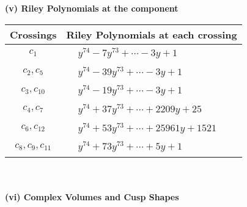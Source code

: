 \documentclass[1p]{elsarticle_modified}
\theoremstyle{definition}
\begin{document}
\newpage\renewcommand{\arraystretch}{1}
\flushleft \textbf{(v) Riley Polynomials at the component}\newline \\
\begin{tabular}{m{50pt}|m{274pt}}
Crossings & \hspace{64pt}Riley Polynomials at each crossing \\
\hline $$\begin{aligned}c_{1}\end{aligned}$$&$\begin{aligned}
&y^{74}-7 y^{73}+\cdots-3 y+1
\end{aligned}$\\
\hline $$\begin{aligned}c_{2},c_{5}\end{aligned}$$&$\begin{aligned}
&y^{74}-39 y^{73}+\cdots-3 y+1
\end{aligned}$\\
\hline $$\begin{aligned}c_{3},c_{10}\end{aligned}$$&$\begin{aligned}
&y^{74}-19 y^{73}+\cdots-3 y+1
\end{aligned}$\\
\hline $$\begin{aligned}c_{4},c_{7}\end{aligned}$$&$\begin{aligned}
&y^{74}+37 y^{73}+\cdots+2209 y+25
\end{aligned}$\\
\hline $$\begin{aligned}c_{6},c_{12}\end{aligned}$$&$\begin{aligned}
&y^{74}+53 y^{73}+\cdots+25961 y+1521
\end{aligned}$\\
\hline $$\begin{aligned}c_{8},c_{9},c_{11}\end{aligned}$$&$\begin{aligned}
&y^{74}+73 y^{73}+\cdots+5 y+1
\end{aligned}$\\
\hline
\end{tabular}\\~\\
\newpage\flushleft \textbf{(vi) Complex Volumes and Cusp Shapes}
\end{document}
